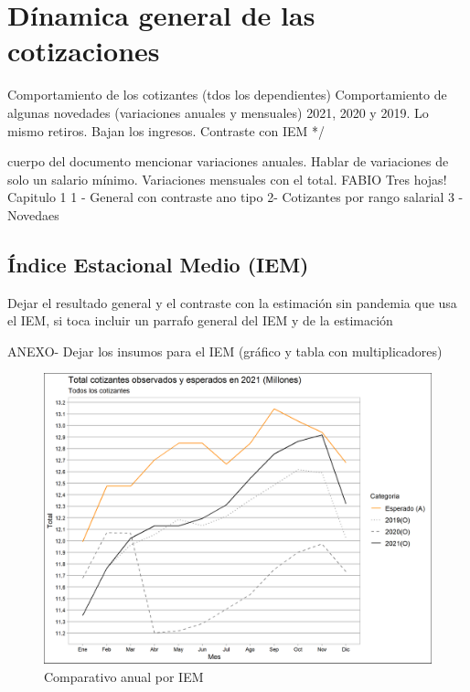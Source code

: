 \section{Dínamica general de las cotizaciones}
Comportamiento de los cotizantes (tdos los dependientes)
Comportamiento de algunas novedades  (variaciones anuales y mensuales) 2021, 2020 y 2019. Lo mismo retiros. Bajan los ingresos. Contraste con IEM */

cuerpo del documento mencionar variaciones anuales. Hablar de variaciones de solo un salario mínimo. 
 Variaciones mensuales con el total.
FABIO 
Tres hojas!  Capitulo 1 
1 - General con contraste ano tipo
2- Cotizantes por rango salarial
3 - Novedaes

\subsection{Índice Estacional Medio (IEM)}
Dejar el resultado general y el contraste con la estimación sin pandemia que usa el IEM, si toca incluir un parrafo general del IEM y de la estimación%

ANEXO- Dejar los insumos para el IEM (gráfico y tabla con multiplicadores)%

\begin{figure}
\label{fig:Cap22:Novedad_1}%
\includegraphics[width = 12.5cm]{figures/01_dinamica/grafico_tot_1_1_1.png}
\caption{Comparativo anual por IEM}
\label{figura:IEM_Total}
\end{figure}
\lipsum[2-3]

\begin{intemize}
\item 
\end{intemize}

